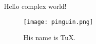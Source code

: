 \documentclass{article}
\begin{document}
Hello complex world!
\begin{figure}
 \texttt{[image: pinguin.png]}
 \caption{\label{tree}His name is TuX.}
 \end{figure}
 \renewcommand{\rmdefault}{ftm} %
 
\end{document}
